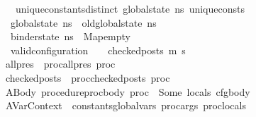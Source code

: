 \begin{isabellebody}
\ \ \ \ \ \ \ \ \ \ \ \ unique{\isacharunderscore}{\kern0pt}constants{\isacharunderscore}{\kern0pt}distinct\ {\isacharparenleft}{\kern0pt}global{\isacharunderscore}{\kern0pt}state\ ns{\isacharparenright}{\kern0pt}\ unique{\isacharunderscore}{\kern0pt}consts\ {\isasymLongrightarrow}\isanewline
\ \ \ \ \ \ \ \ \ \ \ {\isacharparenleft}{\kern0pt}{\isacharparenleft}{\kern0pt}global{\isacharunderscore}{\kern0pt}state\ ns{\isacharparenright}{\kern0pt}\ {\isacharequal}{\kern0pt}\ {\isacharparenleft}{\kern0pt}old{\isacharunderscore}{\kern0pt}global{\isacharunderscore}{\kern0pt}state\ ns{\isacharparenright}{\kern0pt}{\isacharparenright}{\kern0pt}\ {\isasymLongrightarrow}\isanewline
\ \ \ \ \ \ \ \ \ \ \ {\isacharparenleft}{\kern0pt}{\isacharparenleft}{\kern0pt}binder{\isacharunderscore}{\kern0pt}state\ ns{\isacharparenright}{\kern0pt}\ {\isacharequal}{\kern0pt}\ Map{\isachardot}{\kern0pt}empty{\isacharparenright}{\kern0pt}\ {\isasymLongrightarrow}\ \isanewline
\ \ \ \ \ \ \ \ \ \ \ {\isacharparenleft}{\kern0pt}valid{\isacharunderscore}{\kern0pt}configuration\ {\isasymLambda}\ {\isasymGamma}\ {\isacharbrackleft}{\kern0pt}{\isacharbrackright}{\kern0pt}\ checked{\isacharunderscore}{\kern0pt}posts\ m{\isacharprime}{\kern0pt}\ s{\isacharprime}{\kern0pt}{\isacharparenright}{\kern0pt}{\isachardoublequoteclose}\ \isanewline
\ \ \ \ \ \ \ \ \ \ {\isachardoublequoteopen}all{\isacharunderscore}{\kern0pt}pres\ {\isacharequal}{\kern0pt}\ proc{\isacharunderscore}{\kern0pt}all{\isacharunderscore}{\kern0pt}pres\ proc{\isachardoublequoteclose}\ \isanewline
\ \ \ \ \ \ \ \ \ \ {\isachardoublequoteopen}checked{\isacharunderscore}{\kern0pt}posts\ {\isacharequal}{\kern0pt}\ proc{\isacharunderscore}{\kern0pt}checked{\isacharunderscore}{\kern0pt}posts\ proc{\isachardoublequoteclose}\ \isanewline
\ \ \ \ \ \ \ \ \ \ ABody{\isacharcolon}{\kern0pt}\ {\isachardoublequoteopen}procedure{\isachardot}{\kern0pt}proc{\isacharunderscore}{\kern0pt}body\ proc\ {\isacharequal}{\kern0pt}\ Some\ {\isacharparenleft}{\kern0pt}locals{\isacharcomma}{\kern0pt}\ cfg{\isacharunderscore}{\kern0pt}body{\isacharparenright}{\kern0pt}{\isachardoublequoteclose}\ \isanewline
\ \ \ \ \ \ \ \ \ \ AVarContext{\isacharcolon}{\kern0pt}{\isachardoublequoteopen}{\isasymLambda}\ {\isacharequal}{\kern0pt}\ {\isacharparenleft}{\kern0pt}constants{\isacharat}{\kern0pt}global{\isacharunderscore}{\kern0pt}vars{\isacharcomma}{\kern0pt}\ {\isacharparenleft}{\kern0pt}proc{\isacharunderscore}{\kern0pt}args\ proc{\isacharparenright}{\kern0pt}{\isacharat}{\kern0pt}locals{\isacharparenright}{\kern0pt}{\isachardoublequoteclose}\ \isanewline

\end{isabellebody}
